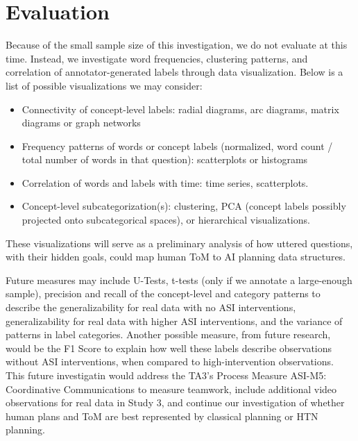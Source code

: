 \section{Evaluation}

Because of the small sample size of this investigation, we do not evaluate at
this time. Instead, we investigate word frequencies, clustering patterns, and
correlation of annotator-generated labels through data visualization. Below is
a list of possible visualizations we may consider:

\begin{itemize}
    \item Connectivity of concept-level labels: radial diagrams, arc diagrams, matrix diagrams or graph networks
    \item Frequency patterns of words or concept labels (normalized, word count / total number of words in that question): scatterplots or histograms
    \item Correlation of words and labels with time: time series, scatterplots. 
    \item Concept-level subcategorization(s): clustering, PCA (concept labels possibly projected onto subcategorical spaces), or hierarchical visualizations.
\end{itemize}


These visualizations will serve as a preliminary analysis of how uttered questions, with their hidden goals, could map  human ToM to AI planning data structures.

Future measures may include U-Tests, t-tests (only if we annotate a large-enough sample), precision and recall of the
concept-level and category patterns to describe the generalizability for real data with no ASI interventions, generalizability for
real data with higher ASI interventions, and the variance of patterns in label categories. Another possible measure, from future research, would be the F1 Score to explain how
well these labels describe observations without ASI interventions, when compared to
high-intervention observations. This future investigatin would address the TA3’s Process Measure ASI-M5: Coordinative Communications   to measure teamwork, include additional video observations for real data in Study 3, and continue our investigation of whether human plans and ToM are best represented by classical planning or HTN planning.


